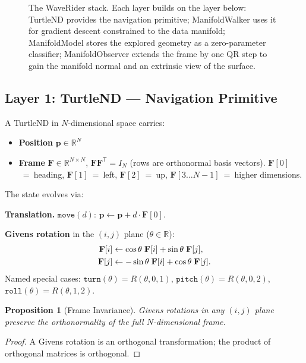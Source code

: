 \documentclass[12pt,letterpaper]{article}
\newtheorem{proposition}{Proposition}
\newcommand{\RR}{\mathbb{R}}
\newcommand{\bF}{\mathbf{F}}
\newcommand{\bp}{\mathbf{p}}
\newcommand{\T}{\mathsf{T}}
\begin{document}
\begin{figure}[t]
\caption{The WaveRider stack.  Each layer builds on the layer below: TurtleND
provides the navigation primitive; ManifoldWalker uses it for gradient descent
constrained to the data manifold; ManifoldModel stores the explored geometry as
a zero-parameter classifier; ManifoldObserver extends the frame by one QR step
to gain the manifold normal and an extrinsic view of the surface.}
\label{fig:stack}
\end{figure}

\subsection{Layer 1: TurtleND --- Navigation Primitive}

A TurtleND in $N$-dimensional space carries:
\begin{itemize}[leftmargin=*]
  \item \textbf{Position} $\bp \in \RR^N$
  \item \textbf{Frame} $\bF \in \RR^{N \times N}$, $\bF\bF^\T = I_N$ (rows are
    orthonormal basis vectors).  $\bF[0]$~=~heading, $\bF[1]$~=~left,
    $\bF[2]$~=~up, $\bF[3\ldots N{-}1]$~=~higher dimensions.
\end{itemize}

The state evolves via:

\textbf{Translation.}
$\texttt{move}(d)$: $\bp \leftarrow \bp + d\cdot\bF[0]$.

\textbf{Givens rotation} in the $(i,j)$ plane ($\theta \in \RR$):
\begin{align}
  \bF[i] &\leftarrow \cos\theta\;\bF[i] + \sin\theta\;\bF[j], \notag\\
  \bF[j] &\leftarrow -\sin\theta\;\bF[i] + \cos\theta\;\bF[j]. \label{eq:givens}
\end{align}
Named special cases: $\texttt{turn}(\theta) = R(\theta,0,1)$, $\texttt{pitch}(\theta) = R(\theta,0,2)$, $\texttt{roll}(\theta) = R(\theta,1,2)$.

\begin{proposition}[Frame Invariance]
Givens rotations in any $(i,j)$ plane preserve the orthonormality of the full
$N$-dimensional frame.
\end{proposition}
\begin{proof}
A Givens rotation is an orthogonal transformation; the product of orthogonal
matrices is orthogonal.
\end{proof}
\end{document}
